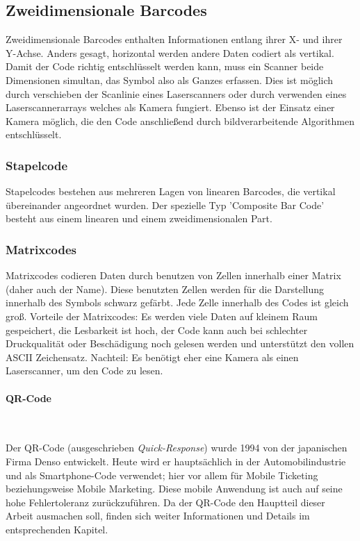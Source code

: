 \subsection{Zweidimensionale Barcodes}
Zweidimensionale Barcodes enthalten Informationen entlang ihrer X- und ihrer Y-Achse. Anders gesagt, horizontal werden andere Daten codiert als vertikal.
Damit der Code richtig entschlüsselt werden kann, muss ein Scanner beide Dimensionen simultan, das Symbol also als Ganzes erfassen. Dies ist möglich durch verschieben der Scanlinie eines Laserscanners oder durch verwenden eines Laserscannerarrays welches als Kamera fungiert. Ebenso ist der Einsatz einer Kamera möglich, die den Code anschließend durch bildverarbeitende Algorithmen entschlüsselt.

\subsubsection{Stapelcode}
Stapelcodes bestehen aus mehreren Lagen von linearen Barcodes, die vertikal übereinander angeordnet wurden.
Der spezielle Typ 'Composite Bar Code' besteht aus einem linearen und einem zweidimensionalen Part.

\subsubsection{Matrixcodes}
Matrixcodes codieren Daten durch benutzen von Zellen innerhalb einer Matrix (daher auch der Name). Diese benutzten Zellen werden für die Darstellung innerhalb des Symbols schwarz gefärbt. Jede Zelle innerhalb des Codes ist gleich groß. 
Vorteile der Matrixcodes: Es werden viele Daten auf kleinem Raum gespeichert, die Lesbarkeit ist hoch, der Code kann auch bei schlechter Druckqualität oder Beschädigung noch gelesen werden und unterstützt den vollen ASCII Zeichensatz.
Nachteil: Es benötigt eher eine Kamera als einen Laserscanner, um den Code zu lesen. 
\samepage
\paragraph{QR-Code}~

Der QR-Code (ausgeschrieben \textit{Quick-Response}) wurde 1994 von der japanischen Firma Denso entwickelt. Heute wird er hauptsächlich in der Automobilindustrie und als Smartphone-Code verwendet; hier vor allem für Mobile Ticketing beziehungsweise Mobile Marketing. Diese mobile Anwendung ist auch auf seine hohe Fehlertoleranz zurückzuführen. Da der QR-Code den Hauptteil dieser Arbeit ausmachen soll, finden sich weiter Informationen und Details im entsprechenden Kapitel.

